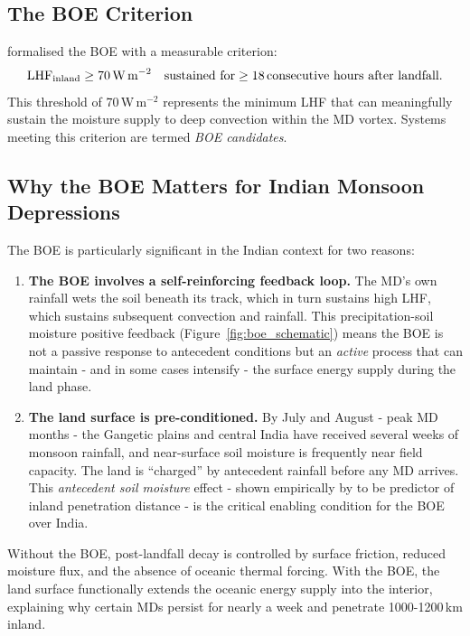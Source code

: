 \subsection{The BOE Criterion}
\label{subsec:boe_criterion}

\cite{andersen2013} formalised the BOE with a measurable criterion:
\begin{equation}
  \text{LHF}_\text{inland} \geq 70\,\text{W\,m}^{-2}
  \quad \text{sustained for} \geq 18\,\text{consecutive hours after landfall.}
  \label{eq:boe_intro}
\end{equation}
This threshold of 70\,W\,m$^{-2}$ represents the minimum LHF that can
meaningfully sustain the moisture supply to deep convection within
the MD vortex. Systems meeting this criterion are termed \emph{BOE candidates}.

\subsection{Why the BOE Matters for Indian Monsoon Depressions}
\label{subsec:boe_significance}

The BOE is particularly significant in the Indian context for two reasons:
\begin{enumerate}
  \item \textbf{The BOE involves a self-reinforcing feedback loop.}
    The MD's own rainfall wets the soil beneath its track, which in
    turn sustains high LHF, which sustains subsequent convection and
    rainfall. This precipitation-soil moisture positive feedback
    (Figure~\ref{fig:boe_schematic}) means the BOE is not a passive
    response to antecedent conditions but an \emph{active} process
    that can maintain - and in some cases intensify - the surface
    energy supply during the land phase.
  \item \textbf{The land surface is pre-conditioned.} By July and
    August - peak MD months - the Gangetic plains and central India have
    received several weeks of monsoon rainfall, and near-surface soil
    moisture is frequently near field capacity. The land is ``charged''
    by antecedent rainfall before any MD arrives. This  \emph{antecedent
    soil moisture} effect - shown empirically by
    \autocite{kishtawal2013enhancement} to be predictor of inland penetration
    distance - is the critical enabling condition for the BOE over India.
\end{enumerate}

Without the BOE, post-landfall decay is controlled by surface
friction, reduced moisture flux, and the absence of oceanic thermal
forcing. With the BOE, the land surface functionally extends the
oceanic energy supply into the interior, explaining why certain MDs
persist for nearly a week and penetrate 1000-1200\,km inland.

